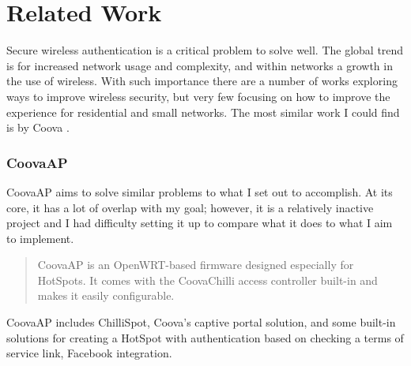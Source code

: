 \section{Related Work}
\label{section:relatedwork}
Secure wireless authentication is a critical problem to solve well. The global trend is for
increased network usage and complexity, and within networks a growth in the use of wireless. With
such importance there are a number of works exploring ways to improve wireless security, but very
few focusing on how to improve the experience for residential and small networks. The most similar
work I could find is by Coova \cite{product:CoovaAP}.

\subsubsection{CoovaAP}
CoovaAP aims to solve similar problems to what I set out to accomplish. At its core, it has
a lot of overlap with my goal; however, it is a relatively inactive project and I had difficulty
setting it up to compare what it does to what I aim to implement.

\begin{quote}
CoovaAP is an OpenWRT-based firmware designed especially for HotSpots. It comes with the CoovaChilli access controller built-in and makes it easily configurable. \cite{product:CoovaAP}
\end{quote}

CoovaAP includes ChilliSpot, Coova's captive portal solution, and some built-in solutions for
creating a HotSpot with authentication based on checking a terms of service link, Facebook
integration.